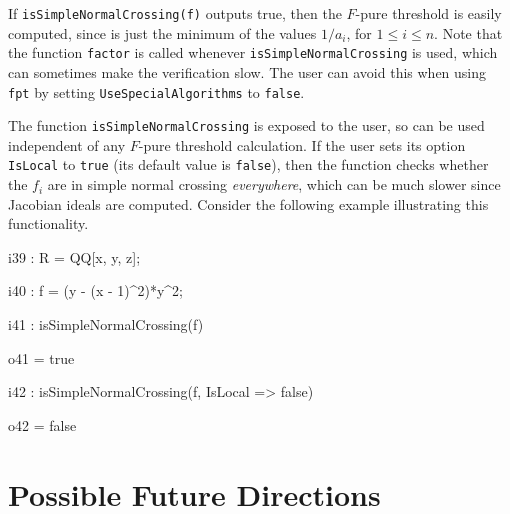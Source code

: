 \documentclass{amsart}
\begin{document}

If \texttt{isSimpleNormalCrossing(f)} outputs true, then the $F$-pure threshold is easily computed, since is just the minimum of the values $1/a_i$, for $1 \leq i \leq n$.
Note that the function \texttt{factor} is called whenever \texttt{isSimpleNormalCrossing} is used, which can sometimes make the verification slow.  The user can avoid this when using \texttt{fpt} by setting \texttt{UseSpecialAlgorithms} to \texttt{false}.

The function \texttt{isSimpleNormalCrossing} is exposed to the user, so can be used independent of any $F$-pure threshold calculation.
If the user sets its option \texttt{IsLocal} to \texttt{true} (its default value is \texttt{false}), then the function checks whether the $f_i$ are in simple normal crossing \emph{everywhere}, which can be much slower since Jacobian ideals are computed. Consider the following example illustrating this functionality.

\bigskip
{\small
{}
\begin{MyVerbatim}
i39 : R = QQ[x, y, z];

i40 : f = (y - (x - 1)^2)*y^2; 

i41 : isSimpleNormalCrossing(f)

o41 = true

i42 : isSimpleNormalCrossing(f, IsLocal => false)

o42 = false
\end{MyVerbatim}
}
\bigskip












\section{Possible Future Directions}
\label{sec.FutureDirections}
\end{document}
